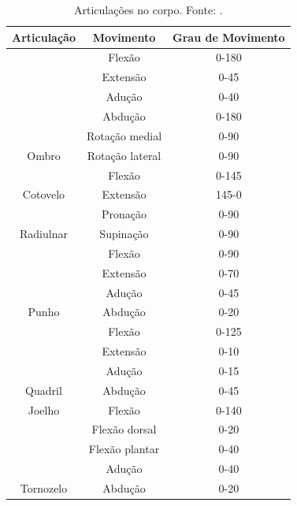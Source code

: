    \begin{table}[H]
   \centering
   \caption{Articulações no corpo. Fonte: \cite{manualGoniometria}.}
   \label{Juntas no corpo}
   \begin{tabular}{|c|c|c|}
   \hline
   \rowcolor[HTML]{C0C0C0}
   Articulação                 & Movimento       & Grau de  Movimento \\ \hline
                               & Flexão          & 0-180              \\ \cline{2-3}
                               & Extensão        & 0-45               \\ \cline{2-3}
                               & Adução          & 0-40               \\ \cline{2-3}
                               & Abdução         & 0-180              \\ \cline{2-3}
                               & Rotação medial  & 0-90               \\ \cline{2-3}
   \multirow{-6}{*}{Ombro}     & Rotação lateral & 0-90               \\ \hline
                               & Flexão          & 0-145              \\ \cline{2-3}
   \multirow{-2}{*}{Cotovelo}  & Extensão        & 145-0              \\ \hline
                               & Pronação        & 0-90               \\ \cline{2-3}
   \multirow{-2}{*}{Radiulnar} & Supinação       & 0-90               \\ \hline
                               & Flexão          & 0-90               \\ \cline{2-3}
                               & Extensão        & 0-70               \\ \cline{2-3}
                               & Adução          & 0-45               \\ \cline{2-3}
   \multirow{-4}{*}{Punho}     & Abdução         & 0-20               \\ \hline
                               & Flexão          & 0-125               \\ \cline{2-3}
                               & Extensão        & 0-10               \\ \cline{2-3}
                               & Adução          & 0-15               \\ \cline{2-3}
\multirow{-4}{*}{Quadril}      & Abdução         & 0-45               \\ \hline
Joelho  & Flexão        & 0-140              \\ \hline
                            & Flexão dorsal         & 0-20               \\ \cline{2-3}
                            & Flexão plantar        & 0-40               \\ \cline{2-3}
                            & Adução          & 0-40               \\ \cline{2-3}
\multirow{-4}{*}{Tornozelo}     & Abdução         & 0-20               \\ \hline


\end{tabular}
\end{table}
